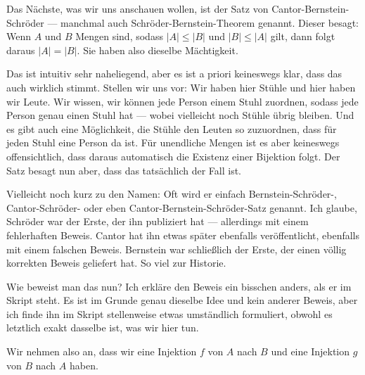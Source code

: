 \begin{spoken-clean}[00:23:33 - 00:24:22]
Das Nächste, was wir uns anschauen wollen, ist der Satz von Cantor-Bernstein-Schröder --- manchmal auch Schröder-Bernstein-Theorem genannt. Dieser besagt: Wenn $A$ und $B$ Mengen sind, sodass $|A| \le |B|$ und $|B| \le |A|$ gilt, dann folgt daraus $|A| = |B|$. Sie haben also dieselbe Mächtigkeit.

Das ist intuitiv sehr naheliegend, aber es ist a priori keineswegs klar, dass das auch wirklich stimmt. Stellen wir uns vor: Wir haben hier Stühle und hier haben wir Leute. Wir wissen, wir können jede Person einem Stuhl zuordnen, sodass jede Person genau einen Stuhl hat --- wobei vielleicht noch Stühle übrig bleiben. Und es gibt auch eine Möglichkeit, die Stühle den Leuten so zuzuordnen, dass für jeden Stuhl eine Person da ist. Für unendliche Mengen ist es aber keineswegs offensichtlich, dass daraus automatisch die Existenz einer Bijektion folgt. Der Satz besagt nun aber, dass das tatsächlich der Fall ist.

Vielleicht noch kurz zu den Namen: Oft wird er einfach Bernstein-Schröder-, Cantor-Schröder- oder eben Cantor-Bernstein-Schröder-Satz genannt. Ich glaube, Schröder war der Erste, der ihn publiziert hat --- allerdings mit einem fehlerhaften Beweis. Cantor hat ihn etwas später ebenfalls veröffentlicht, ebenfalls mit einem falschen Beweis. Bernstein war schließlich der Erste, der einen völlig korrekten Beweis geliefert hat. So viel zur Historie.

Wie beweist man das nun? Ich erkläre den Beweis ein bisschen anders, als er im Skript steht. Es ist im Grunde genau dieselbe Idee und kein anderer Beweis, aber ich finde ihn im Skript stellenweise etwas umständlich formuliert, obwohl es letztlich exakt dasselbe ist, was wir hier tun.

Wir nehmen also an, dass wir eine Injektion $f$ von $A$ nach $B$ und eine Injektion $g$ von $B$ nach $A$ haben.
\end{spoken-clean}



